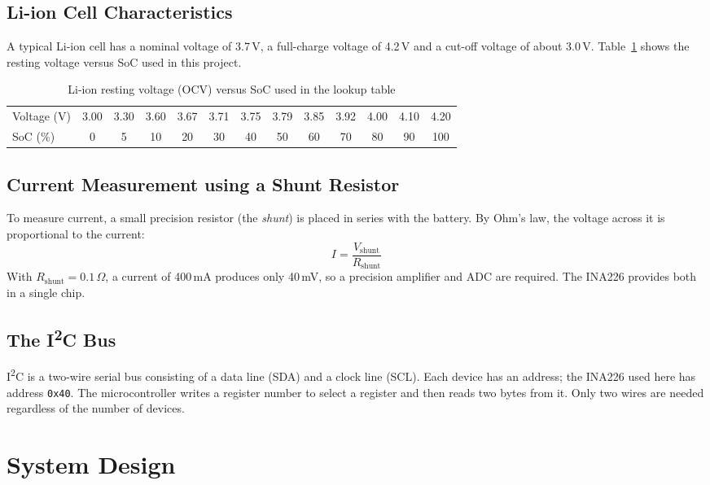 \documentclass[12pt,a4paper,oneside]{report}
\begin{document}
\section{Li-ion Cell Characteristics}
A typical Li-ion cell has a nominal voltage of 3.7\,V, a full-charge voltage of 4.2\,V and a cut-off voltage of about 3.0\,V. Table~\ref{tab:ocv} shows the resting voltage versus SoC used in this project.

\begin{table}[H]
\centering
\caption{Li-ion resting voltage (OCV) versus SoC used in the lookup table}
\label{tab:ocv}
\setlength{\tabcolsep}{4pt}\small
\begin{tabular}{l*{12}{c}}
\toprule
Voltage (V) & 3.00 & 3.30 & 3.60 & 3.67 & 3.71 & 3.75 & 3.79 & 3.85 & 3.92 & 4.00 & 4.10 & 4.20 \\
SoC (\%)    & 0 & 5 & 10 & 20 & 30 & 40 & 50 & 60 & 70 & 80 & 90 & 100 \\
\bottomrule
\end{tabular}
\end{table}

\section{Current Measurement using a Shunt Resistor}
To measure current, a small precision resistor (the \emph{shunt}) is placed in series with the battery. By Ohm's law, the voltage across it is proportional to the current:
\begin{equation}
  I = \frac{V_{\text{shunt}}}{R_{\text{shunt}}}
\end{equation}
With $R_{\text{shunt}} = 0.1\,\Omega$, a current of 400\,mA produces only 40\,mV, so a precision amplifier and ADC are required. The INA226 provides both in a single chip.

\section{The I\textsuperscript{2}C Bus}
I\textsuperscript{2}C is a two-wire serial bus consisting of a data line (SDA) and a clock line (SCL). Each device has an address; the INA226 used here has address \texttt{0x40}. The microcontroller writes a register number to select a register and then reads two bytes from it. Only two wires are needed regardless of the number of devices.

\chapter{System Design}\label{ch:design}
\end{document}
